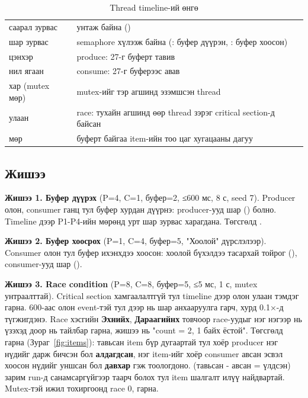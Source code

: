 \documentclass[12pt,a4paper]{article}
\begin{document}
\begin{table}[H]\centering\small
\caption{Thread timeline-ий өнгө}\label{tab:legend}
\begin{tabular}{|L{0.3\textwidth}|L{0.7\textwidth}|}\hline
{} &  \\\hline
саарал зурвас & унтаж байна () \\\hline
шар зурвас & semaphore хүлээж байна (: буфер дүүрэн, : буфер хоосон) \\\hline
цэнхэр  & produce: 27-г буферт тавив \\\hline
нил ягаан  & consume: 27-г буферээс авав \\\hline
хар  (mutex мөр) & mutex-ийг тэр агшинд эзэмшсэн thread \\\hline
улаан & race: тухайн агшинд өөр thread зэрэг critical section-д байсан \\\hline
{} мөр & буферт байгаа item-ийн тоо цаг хугацааны дагуу \\\hline
\end{tabular}
\end{table}

\subsection{Жишээ}
\textbf{Жишээ 1. Буфер дүүрэх} (P=4, C=1, буфер=2, ≤600 мс, 8 с, seed 7). Producer олон, consumer ганц тул буфер хурдан дүүрнэ: producer-ууд шар () болно. Timeline дээр P1-P4-ийн мөрөнд урт шар зурвас харагдана. Төгсгөлд .


\textbf{Жишээ 2. Буфер хоосрох} (P=1, C=4, буфер=5, "Хоолой" дүрслэлээр). Consumer олон тул буфер ихэнхдээ хоосон: хоолой бүхэлдээ тасархай тойрог (), consumer-ууд шар ().


\textbf{Жишээ 3. Race condition} (P=8, C=8, буфер=5, ≤5 мс, 1 с, mutex унтраалттай). Critical section хамгаалалтгүй тул timeline дээр олон улаан тэмдэг гарна. 600-аас олон event-тэй тул дээр нь шар анхааруулга гарч, хурд 0.1×-д түгжигдэнэ. Race хэсгийн \textbf{Эхнийх}, \textbf{Дараагийнх} товчоор race-уудыг нэг нэгээр нь үзэхэд доор нь тайлбар гарна, жишээ нь "count = 2, 1 байх ёстой". Төгсгөлд  гарна (Зураг~\ref{fig:items}): тавьсан item бүр дугаартай тул хоёр producer нэг нүдийг дарж бичсэн бол \textbf{алдагдсан}, нэг item-ийг хоёр consumer авсан эсвэл хоосон нүдийг уншсан бол \textbf{давхар} гэж тоологдоно.  (тавьсан - авсан = үлдсэн) зарим run-д санамсаргүйгээр таарч болох тул item шалгалт илүү найдвартай. Mutex-тэй ижил тохиргоонд race 0,  гарна.
\end{document}
